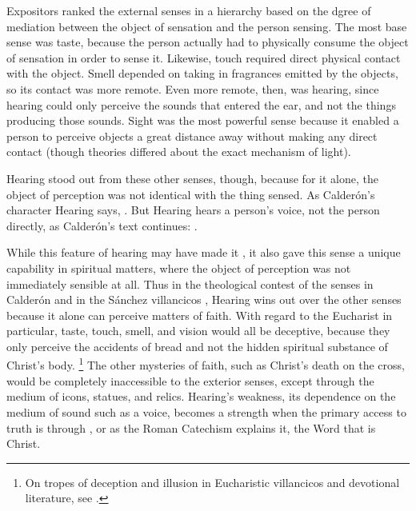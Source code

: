 Expositors ranked the external senses in a hierarchy based on the dgree of mediation between the object of sensation and the person sensing.
The most base sense was taste, because the person actually had to physically consume the object of sensation in order to sense it.
Likewise, touch required direct physical contact with the object.
Smell depended on taking in fragrances emitted by the objects, so its contact was more remote.
Even more remote, then, was hearing, since hearing could only perceive the sounds that entered the ear, and not the things producing those sounds.
Sight was the most powerful sense because it enabled a person to perceive objects a great distance away without making any direct contact (though theories differed about the exact mechanism of light).\citXXX{}

Hearing stood out from these other senses, though, because for it alone, the object of perception was not identical with the thing sensed.
As Calderón's character Hearing says, .%
  \autocite[]{Calderon:Retiro}
But Hearing hears a person's voice, not the person directly, as Calderón's text continues: .%
  \autocite[]{Calderon:Retiro}

While this feature of hearing may have made it , it also gave this sense a unique capability in spiritual matters, where the object of perception was not immediately sensible at all.
Thus in the theological contest of the senses in Calderón and in the Sánchez villancicos , Hearing wins out over the other senses because it alone can perceive matters of faith.
With regard to the Eucharist in particular, taste, touch, smell, and vision would all be deceptive, because they only perceive the accidents of bread and not the hidden spiritual substance of Christ's body.%
  \footnote{On tropes of deception and illusion in Eucharistic villancicos and devotional literature, see \autocite{Cashner:Cards}.}
The other mysteries of faith, such as Christ's death on the cross, would be completely inaccessible to the exterior senses, except through the medium of icons, statues, and relics.
Hearing's weakness, its dependence on the medium of sound such as a voice, becomes a strength when the primary access to truth is through , or as the Roman Catechism explains it, the Word that is Christ.

